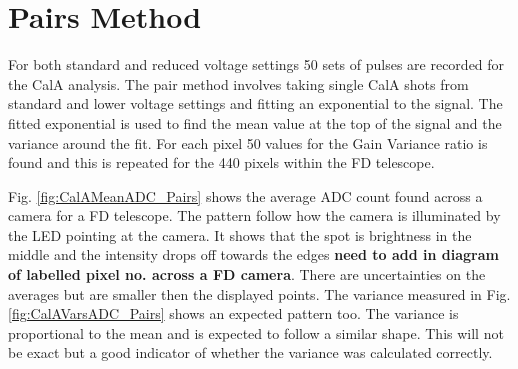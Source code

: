 \section{Pairs Method}

For both standard and reduced voltage settings 50 sets of pulses are recorded for the CalA analysis. The pair method involves taking single CalA shots from standard and lower voltage settings and fitting an exponential to the signal. The fitted exponential is used to find the mean value at the top of the signal and the variance around the fit. For each pixel 50 values for the Gain Variance ratio is found and this is repeated for the 440 pixels within the FD telescope.

Fig. \ref{fig:CalAMeanADC_Pairs} shows the average ADC count found across a camera for a FD telescope. The pattern follow how the camera is illuminated by the LED pointing at the camera. It shows that the spot is brightness in the middle and the intensity drops off towards the edges \textbf{need to add in diagram of labelled pixel no. across a FD camera}. There are uncertainties on the averages but are smaller then the displayed points. The variance measured in Fig. \ref{fig:CalAVarsADC_Pairs} shows an expected pattern too. The variance is proportional to the mean and is expected to follow a similar shape. This will not be exact but a good indicator of whether the variance was calculated correctly.

